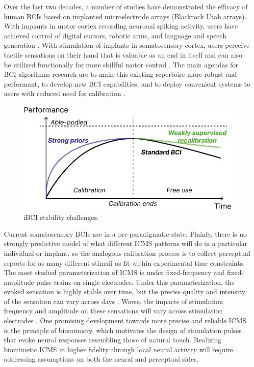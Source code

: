\documentclass[12pt,oneside]{report}
\begin{document}
Over the last two decades, a number of studies have demonstrated the efficacy of human BCIs based on implanted microelectrode arrays (Blackrock Utah arrays). With implants in motor cortex recording neuronal spiking activity, users have achieved control of digital cursors, robotic arms, and language and speech generation \citep{refsPlaceholder}. With stimulation of implants in somatosensory cortex, users perceive tactile sensations on their hand that is valuable as an end in itself and can also be utilized functionally for more skillful motor control \citep{flesher2016}. The main agendas for BCI algorithms research are to make this existing repertoire more robust and performant, to develop new BCI capabilities, and to deploy convenient systems to users with reduced need for calibration \citep{surveyPlaceholder}.

\begin{figure}[h]
  \centering
  \includegraphics[width=0.5\linewidth]{ch1_ibci_stability.png}
  \caption{iBCI stability challenges.}
  \label{fig:ibci_stability}
\end{figure}

Current somatosensory BCIs are in a pre-paradigmatic state. Plainly, there is no strongly predictive model of what different ICMS patterns will do in a particular individual or implant, so the analogous calibration process is to collect perceptual reports for as many different stimuli as fit within experimental time constraints. The most studied parameterization of ICMS is under fixed-frequency and fixed-amplitude pulse trains on single electrodes. Under this parameterization, the evoked sensation is highly stable over time, but the precise quality and intensity of the sensation can vary across days \citep{citationNeeded}. Worse, the impacts of stimulation frequency and amplitude on these sensations will vary across stimulation electrodes \citep{hughesPlaceholder}. One promising development towards more precise and reliable ICMS is the principle of biomimicry, which motivates the design of stimulation pulses that evoke neural responses resembling those of natural touch. Realizing biomimetic ICMS in higher fidelity through local neural activity will require addressing assumptions on both the neural and perceptual sides.
\end{document}
